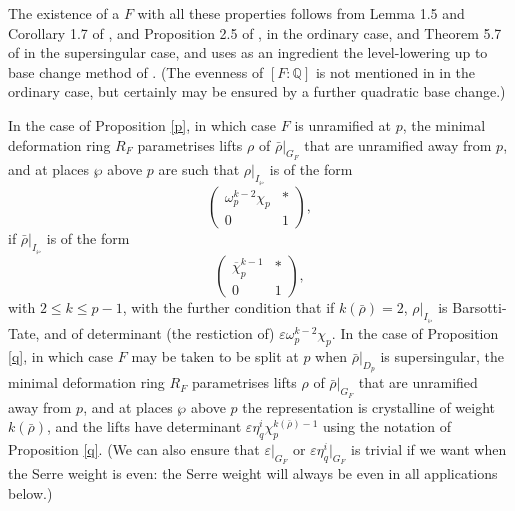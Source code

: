 \documentclass[12pt]{amsart}
\newcommand{\Q}{\mathbb{Q}}
\newcommand{\rhobar}{\overline{\rho}}
\def\rhobar{ {\bar {\rho} } }
\newcommand{\vep}{{\varepsilon}}
\begin{document}
The existence of a $F$ with all these properties 
follows from Lemma 1.5 and Corollary 1.7 of \cite{Tay1}, and Proposition 2.5 of \cite{KW}, in the ordinary case, and Theorem 5.7 of \cite{Tay2} in the supersingular case, and uses as an ingredient the level-lowering up to base change method of \cite{SW1}. (The evenness of $[F:\Q]$ is not mentioned in \cite{Tay1} in the ordinary case,
but certainly may be ensured by a further quadratic base change.) 

In the case of Proposition \ref{p}, in which case $F$ 
is unramified at $p$, the minimal deformation ring $R_F$ 
parametrises lifts $\rho$ of $\rhobar|_{G_F}$ that are unramified away from $p$, and
at places $\wp$ above $p$ are such that  $\rho|_{I_{\wp}}$ is of the form 
$$\left( \begin{array}{cc}
    \omega_p^{k-2}\chi_p  & *  \\
    0 & 1
\end{array} \right),$$ if $\rhobar|_{I_{\wp}}$
is of the form $$\left( \begin{array}{cc}
    \overline \chi_p ^{k-1} & *  \\
    0 & 1
\end{array} \right),$$ with $2 \leq k \leq p-1$, with the further condition that if $k(\rhobar)=2$,  $\rho|_{I_{\wp}}$ is Barsotti-Tate, and of determinant (the restiction of) $\vep \omega_p^{k-2}\chi_p$. In the case of Proposition \ref{q}, in which case $F$ may be taken to be split at $p$ when $\rhobar|_{D_p}$ is supersingular, the minimal deformation ring $R_F$ 
parametrises lifts $\rho$ of $\rhobar|_{G_F}$ that are unramified away from $p$, and at places $\wp$ above $p$ the representation is crystalline of weight $k(\rhobar)$, and the lifts have determinant $\vep \eta_q^i \chi_p^{k(\rhobar)-1}$
using the notation of Proposition \ref{q}. (We can also ensure that $\vep|_{G_F} $ or $\vep \eta_q^i|_{G_F}$ is trivial if we want when the Serre weight is even:
the Serre weight will always be even in all applications below.)
\end{document}
